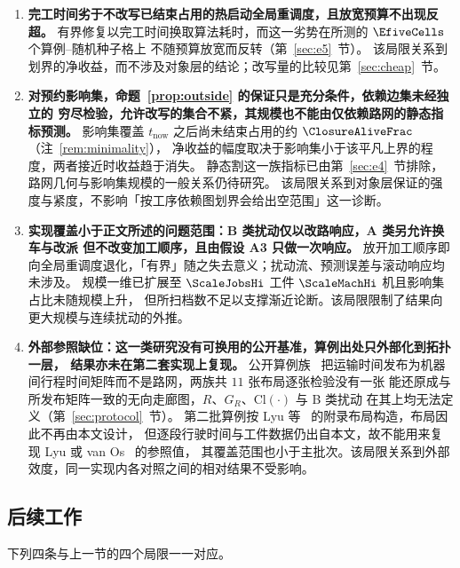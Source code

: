 \begin{enumerate}[leftmargin=1.6em,itemsep=0.35em]
\item \textbf{完工时间劣于不改写已结束占用的热启动全局重调度，且放宽预算不出现反超。}
有界修复以完工时间换取算法耗时，而这一劣势在所测的 \(\EfiveCells\) 个算例--随机种子格上
不随预算放宽而反转（第~\ref{sec:e5}~节）。
该局限关系到划界的净收益，而不涉及对象层的结论；改写量的比较见第~\ref{sec:cheap}~节。

\item \textbf{对预约影响集，命题~\ref{prop:outside} 的保证只是充分条件，依赖边集未经独立的
穷尽检验，允许改写的集合不紧，其规模也不能由仅依赖路网的静态指标预测。}
影响集覆盖 \(t_{\mathrm{now}}\) 之后尚未结束占用的约 \(\ClosureAliveFrac\)（注~\ref{rem:minimality}），
净收益的幅度取决于影响集小于该平凡上界的程度，两者接近时收益趋于消失。
静态割这一族指标已由第~\ref{sec:e4}~节排除，路网几何与影响集规模的一般关系仍待研究。
该局限关系到对象层保证的强度与紧度，不影响「按工序依赖图划界会给出空范围」这一诊断。

\item \textbf{实现覆盖小于正文所述的问题范围：B 类扰动仅以改路响应，A 类另允许换车与改派
但不改变加工顺序，且由假设 A3 只做一次响应。}
放开加工顺序即向全局重调度退化，「有界」随之失去意义；扰动流、预测误差与滚动响应均未涉及。
规模一维已扩展至 \(\ScaleJobsHi\) 工件 \(\ScaleMachHi\) 机且影响集占比未随规模上升，
但所扫档数不足以支撑渐近论断。该局限限制了结果向更大规模与连续扰动的外推。

\item \textbf{外部参照缺位：这一类研究没有可换用的公开基准，算例出处只外部化到拓扑一层，
结果亦未在第二套实现上复现。}
公开算例族~\cite{homayouni2021production,bilge1995time} 把运输时间发布为机器间行程时间矩阵而不是路网，两族共 \(11\) 张布局逐张检验没有一张
能还原成与所发布矩阵一致的无向走廊图，\(R\)、\(G_R\)、\(\mathrm{Cl}(\cdot)\) 与 B 类扰动
在其上均无法定义（第~\ref{sec:protocol}~节）。
第二批算例按 Lyu 等~\cite{lyu2019approach} 的附录布局构造，布局因此不再由本文设计，
但逐段行驶时间与工件数据仍出自本文，故不能用来复现 Lyu 或 van Os~\cite{vanos2026exact} 的参照值，
其覆盖范围也小于主批次。该局限关系到外部效度，同一实现内各对照之间的相对结果不受影响。
\end{enumerate}

\subsection{后续工作}
\label{sec:future}

下列四条与上一节的四个局限一一对应。

